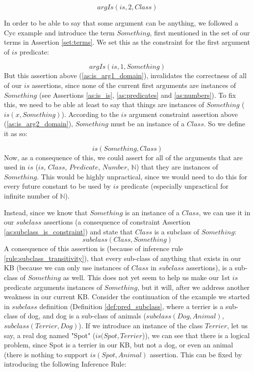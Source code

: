 \begin{equation}\label{as:is_arg2_domain}
argIs(is,2, Class)
\end{equation}

In order to be able to say that some argument can be anything, we followed a 
Cyc example and introduce the term $Something$, first mentioned in the set of our 
terms in Assertion \ref{set:terms}. We set this as the constraint for the first
argument of $is$ predicate:

\begin{equation}\label{as:is_arg1_domain}
argIs(is,1, Something)
\end{equation}
But this assertion above (\ref{as:is_arg1_domain}), invalidates the correctness
of all of our $is$ assertions, since none of the current first arguments are
instances of $Something$ (see Assertions \ref{as:is_is}, \ref{as:predicates} and 
\ref{as:numbers}). To fix this, we need to be able at least to say that things 
are instances of $Something$ ($is(x,Something)$). According to the $is$ argument
constraint assertion above (\ref{as:is_arg2_domain}), $Something$ must be an 
instance of a $Class$. So we define it as so:

\begin{equation}\label{as:is_something}
	is(Something,Class)
\end{equation}
Now, as a consequence of this, we could assert for all of the arguments that
are used in $is$ ($is$, $Class$, $Predicate$, $Number$, $\mathbb{N}$) that 
they are instances of $Something$. This would
be highly unpractical, since we would need to do this for every future constant
to be used by $is$ predicate (especially unpractical for infinite number of
$\mathbb{N}$).

Instead, since we know that $Something$ is an instance of a $Class$, we can use 
it in our $subclass$ assertions (a consequence of constraint Assertion 
\ref{as:subclass_is_constraint}) and state that $Class$ is a subclass of 
$Something$:
\begin{equation}\label{as:subclass_something}
	subclass(Class, Something)
\end{equation}
A consequence of this assertion is (because of inference rule 
\ref{rule:subclass_transitivity}), that
every sub-class of anything that exists in our KB (because we can only use 
instances of $Class$ in $subclass$ assertions), is a sub-class of $Something$ as
well. This does not yet seem to help us make our 1st $is$ predicate arguments 
instances of $Something$, but it will, after we address another weakness in our
current KB. 
Consider the continuation of the example we started in $subclass$ 
definition (Definition \ref{def:pred_subclass}, where a terrier is a sub-class
of dog, and dog is a sub-class of animals ($subclass(Dog,Animal)$, 
$subclass(Terrier,Dog)$). If we introduce an instance of the
class $Terrier$, let us say, a real dog named "Spot" ($is(Spot,Terrier$)), we can
see that there is a logical problem, since Spot is a terrier in our KB, but
not a dog, or even an animal (there is nothing to support $is(Spot,Animal)$ 
assertion. This can be fixed by introducing the following Inference Rule:

